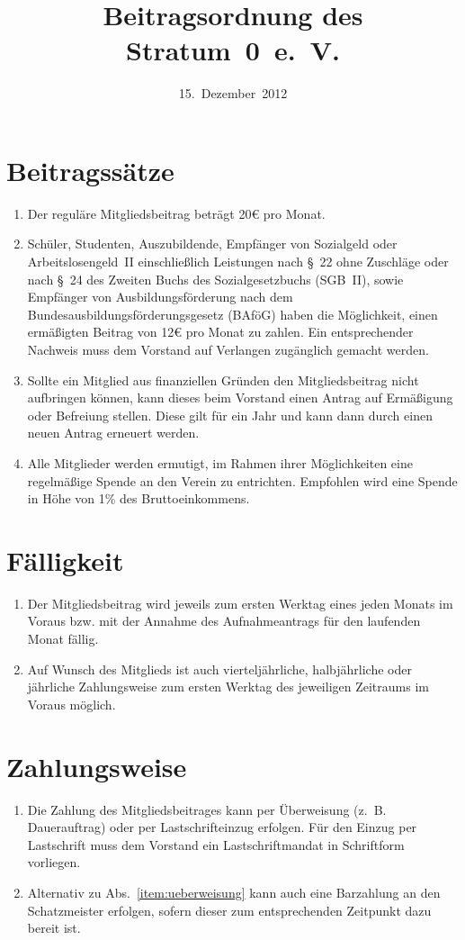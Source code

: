 \documentclass[a4paper,12pt]{scrartcl}
\title{Beitragsordnung des Stratum~0~e.~V.}
\date{15.~Dezember~2012}
\begin{document}
\maketitle

\section{Beitragssätze}
\begin{enumerate}
  \item Der reguläre Mitgliedsbeitrag beträgt 20€ pro Monat.
  \item Schüler, Studenten, Auszubildende, Empfänger von Sozialgeld oder
    Arbeitslosengeld~II
    einschließlich Leistungen nach §~22 ohne Zuschläge oder nach §~24 des
    Zweiten Buchs des Sozialgesetzbuchs (SGB~II), sowie Empfänger von
    Ausbildungsförderung nach dem Bundesausbildungsförderungsgesetz (BAföG)
    haben die Möglichkeit, einen ermäßigten Beitrag von 12€ pro Monat zu
    zahlen. Ein entsprechender Nachweis muss dem Vorstand auf Verlangen
    zugänglich gemacht werden.
  \item Sollte ein Mitglied aus finanziellen Gründen den Mitgliedsbeitrag nicht
    aufbringen können, kann dieses beim Vorstand einen Antrag auf Ermäßigung
    oder Befreiung stellen. Diese gilt für ein Jahr und kann dann durch einen
    neuen Antrag erneuert werden.
  \item Alle Mitglieder werden ermutigt, im Rahmen ihrer Möglichkeiten eine
    regelmäßige Spende an den Verein zu entrichten. Empfohlen wird eine Spende
    in Höhe von 1\% des Bruttoeinkommens.
\end{enumerate}

\section{Fälligkeit}
\begin{enumerate}
  \item Der Mitgliedsbeitrag wird jeweils zum ersten Werktag eines jeden Monats
    im Voraus bzw. mit der Annahme des Aufnahmeantrags für den laufenden Monat
    fällig.
  \item Auf Wunsch des Mitglieds ist auch vierteljährliche, halbjährliche oder
    jährliche Zahlungsweise zum ersten Werktag des jeweiligen Zeitraums im
    Voraus möglich.
\end{enumerate}

\section{Zahlungsweise}
\begin{enumerate}
  \item\label{item:ueberweisung} Die Zahlung des Mitgliedsbeitrages kann per
    Überweisung (z.~B. Dauerauftrag) oder per Lastschrifteinzug erfolgen. Für
    den Einzug per Lastschrift muss dem Vorstand ein Lastschriftmandat in
    Schriftform vorliegen.
  \item Alternativ zu Abs.~\ref{item:ueberweisung} kann auch eine Barzahlung an den
    Schatzmeister erfolgen, sofern dieser zum entsprechenden Zeitpunkt dazu
    bereit ist.
\end{enumerate}
\end{document}
